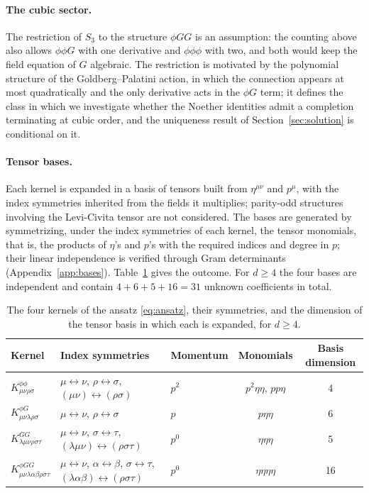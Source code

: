 \documentclass[prd,aps,preprint,superscriptaddress,nofootinbib,amsmath,amssymb,eqsecnum]{revtex4-2}
\begin{document}
\paragraph{The cubic sector.} The restriction of $S_3$ to the structure $\phi GG$ is an
assumption: the counting above also allows $\phi\phi G$ with one derivative and
$\phi\phi\phi$ with two, and both would keep the field equation of $G$ algebraic. The
restriction is motivated by the polynomial structure of the Goldberg--Palatini action, in
which the connection appears at most quadratically and the only derivative acts in the
$\phi G$ term; it defines the class in which we investigate whether the Noether identities
admit a completion terminating at cubic order, and the uniqueness result of
Section~\ref{sec:solution} is conditional on it.

\paragraph{Tensor bases.} Each kernel is expanded in a basis of tensors built from
$\eta^{\mu\nu}$ and $p^\mu$, with the index symmetries inherited from the fields it
multiplies; parity-odd structures involving the Levi-Civita tensor are not considered. The
bases are generated by symmetrizing, under the index symmetries of each kernel, the tensor
monomials, that is, the products of $\eta$'s and $p$'s with the required indices and degree
in $p$; their linear independence is verified through Gram determinants
(Appendix~\ref{app:bases}). Table~\ref{tab:kernels} gives the outcome. For $d\geq4$ the
four bases are independent and contain $4+6+5+16=31$ unknown coefficients in total.

\begin{table}[htb]
\centering
\setlength{\tabcolsep}{10pt}
\begin{tabular}{@{}l>{\raggedright\arraybackslash}p{4.6cm}lcc@{}}
\toprule
Kernel & Index symmetries & Momentum & Monomials & Basis dimension \\
\midrule
$K^{\phi\phi}_{\mu\nu\rho\sigma}$ & $\mu\leftrightarrow\nu$, $\rho\leftrightarrow\sigma$, $(\mu\nu)\leftrightarrow(\rho\sigma)$ & $p^2$ & $p^2\eta\eta$, $pp\eta$ & 4 \\
$K^{\phi G}_{\mu\nu\lambda\rho\sigma}$ & $\mu\leftrightarrow\nu$, $\rho\leftrightarrow\sigma$ & $p$ & $p\eta\eta$ & 6 \\
$K^{GG}_{\lambda\mu\nu\rho\sigma\tau}$ & $\mu\leftrightarrow\nu$, $\sigma\leftrightarrow\tau$, $(\lambda\mu\nu)\leftrightarrow(\rho\sigma\tau)$ & $p^0$ & $\eta\eta\eta$ & 5 \\
$K^{\phi GG}_{\mu\nu\lambda\alpha\beta\rho\sigma\tau}$ & $\mu\leftrightarrow\nu$, $\alpha\leftrightarrow\beta$, $\sigma\leftrightarrow\tau$, $(\lambda\alpha\beta)\leftrightarrow(\rho\sigma\tau)$ & $p^0$ & $\eta\eta\eta\eta$ & 16 \\
\bottomrule
\end{tabular}
\caption{The four kernels of the ansatz \eqref{eq:ansatz}, their symmetries, and the
dimension of the tensor basis in which each is expanded, for $d\geq4$.}
\label{tab:kernels}
\end{table}
\end{document}
